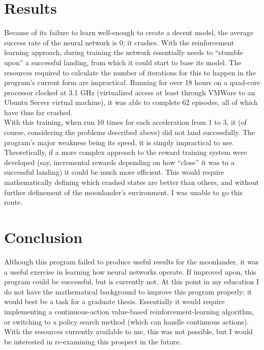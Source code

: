 \documentclass[12pt, article]{scrartcl}
\begin{document}
\section{Results}
Because of its failure to learn well-enough to create a decent model, the average success rate of the neural network is 0; it crashes. With the reinforcement learning approach, during training the network essentially needs to ``stumble upon'' a successful landing, from which it could start to base its model. The resources required to calculate the number of iterations for this to happen in the program's current form are impractical. Running for over 18 hours on a quad-core processor clocked at 3.1 GHz (virtualized access at least through VMWare to an Ubuntu Server virtual machine), it was able to complete 62 episodes, all of which have thus far crashed. \\

With this training, when run 10 times for each acceleration from 1 to 3, it (of course, considering the problems described above) did not land successfully. The program's major weakness being its speed, it is simply impractical to use. Theoretically, if a more complex approach to the reward training system were developed (say, incremental rewards depending on how ``close'' it was to a successful landing) it could be much more efficient. This would require mathematically defining which crashed states are better than others, and without further definement of the moonlander's environment, I was unable to go this route. \\

\section{Conclusion}
Although this program failed to produce useful results for the moonlander, it was a useful exercise in learning how neural networks operate. If improved upon, this program could be successful, but is currently not. At this point in my education I do not have the mathematical background to improve this program properly; it would best be a task for a graduate thesis. Essentially it would require implementing a continuous-action value-based reinforcement-learning algorithm, or switching to a policy search method (which can handle continuous actions). With the resources currently available to me, this was not possible, but I would be interested in re-examining this prospect in the future. \\
\end{document}
